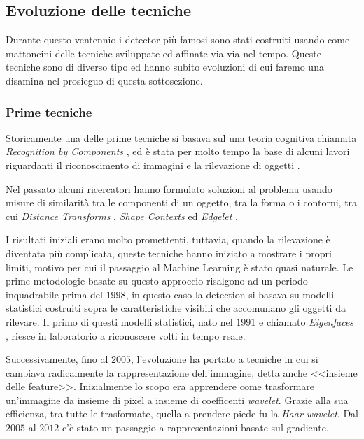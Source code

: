 \subsection{Evoluzione delle tecniche}
Durante questo ventennio i detector più famosi sono stati costruiti usando come mattoncini delle tecniche sviluppate ed affinate via via nel tempo. Queste tecniche sono di diverso tipo ed hanno subito evoluzioni di cui faremo una disamina nel prosieguo di questa sottosezione.
\subsubsection{Prime tecniche}
Storicamente una delle prime tecniche si basava sul una teoria cognitiva chiamata \textit{Recognition by Components} \cite{biederman1987recognition}, ed è stata per molto tempo la base di alcuni lavori riguardanti il riconoscimento di immagini e la rilevazione di oggetti \cite{felzenszwalb2008discriminatively, fischler1973representation, leibe2008robust}.   

Nel passato alcuni ricercatori hanno formulato soluzioni al problema usando misure di similarità tra le componenti di un oggetto, tra la forma o i contorni, tra cui \textit{Distance Transforms} \cite{gavrila1999real}, \textit{Shape Contexts} \cite{belongie2002shape} ed \textit{Edgelet} \cite{wu2005detection}.

I risultati iniziali erano molto promettenti, tuttavia, quando la rilevazione è diventata più complicata, queste tecniche hanno iniziato a mostrare i propri limiti, motivo per cui il passaggio al Machine Learning è stato quasi naturale. Le prime metodologie basate su questo approccio risalgono ad un periodo inquadrabile prima del $1998$, in questo caso la detection si basava su modelli statistici costruiti sopra le caratteristiche visibili che accomunano gli oggetti da rilevare. 
Il primo di questi modelli statistici, nato nel $1991$ e chiamato \textit{Eigenfaces} \cite{turk1991eigenfaces, pentland1994view}, riesce in laboratorio a riconoscere volti in tempo reale.

Successivamente, fino al $2005$, l'evoluzione ha portato a tecniche in cui si cambiava radicalmente la rappresentazione dell'immagine, detta anche <<insieme delle feature>>. Inizialmente lo scopo era apprendere come trasformare un'immagine da insieme di pixel a insieme di coefficenti \textit{wavelet}. Grazie alla sua efficienza, tra tutte le trasformate, quella a prendere piede fu la \textit{Haar wavelet}. Dal $2005$ al $2012$ c'è stato un passaggio a rappresentazioni basate sul gradiente. 

